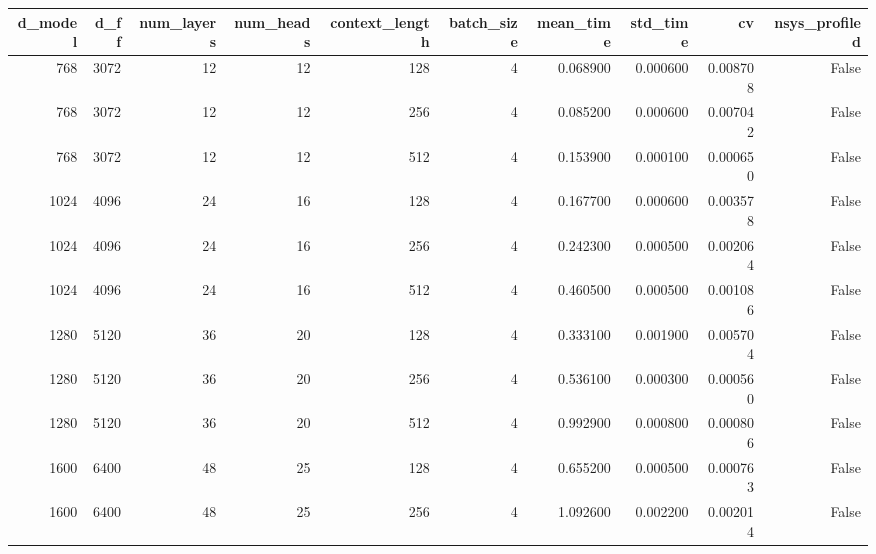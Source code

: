 \begin{tabular}{rrrrrrrrrr}
\toprule
d_model & d_ff & num_layers & num_heads & context_length & batch_size & mean_time & std_time & cv & nsys_profiled \\
\midrule
768 & 3072 & 12 & 12 & 128 & 4 & 0.068900 & 0.000600 & 0.008708 & False \\
768 & 3072 & 12 & 12 & 256 & 4 & 0.085200 & 0.000600 & 0.007042 & False \\
768 & 3072 & 12 & 12 & 512 & 4 & 0.153900 & 0.000100 & 0.000650 & False \\
1024 & 4096 & 24 & 16 & 128 & 4 & 0.167700 & 0.000600 & 0.003578 & False \\
1024 & 4096 & 24 & 16 & 256 & 4 & 0.242300 & 0.000500 & 0.002064 & False \\
1024 & 4096 & 24 & 16 & 512 & 4 & 0.460500 & 0.000500 & 0.001086 & False \\
1280 & 5120 & 36 & 20 & 128 & 4 & 0.333100 & 0.001900 & 0.005704 & False \\
1280 & 5120 & 36 & 20 & 256 & 4 & 0.536100 & 0.000300 & 0.000560 & False \\
1280 & 5120 & 36 & 20 & 512 & 4 & 0.992900 & 0.000800 & 0.000806 & False \\
1600 & 6400 & 48 & 25 & 128 & 4 & 0.655200 & 0.000500 & 0.000763 & False \\
1600 & 6400 & 48 & 25 & 256 & 4 & 1.092600 & 0.002200 & 0.002014 & False \\
\bottomrule
\end{tabular}
